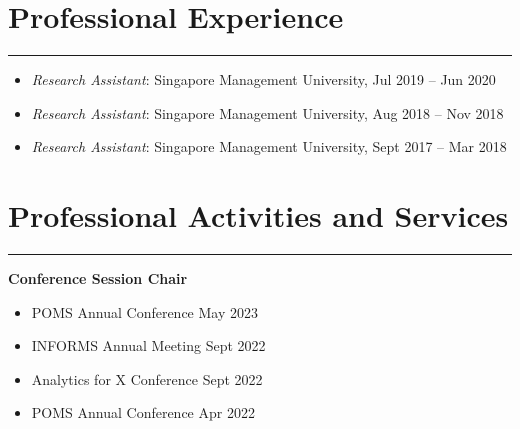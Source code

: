 \documentclass[12pt, a4paper]{article}
\begin{document}
{\begin{itemize}[leftmargin=26pt, itemsep=8pt, parsep=0.2pt, topsep=1pt]
\end{itemize}




\section*{Professional Experience}
\vspace*{0.4em}
\hrule height 0.5pt



\begin{itemize}[leftmargin=26pt, itemsep=0pt, parsep=0.2pt, topsep=1pt]
	\item {\it Research Assistant}: Singapore Management University, Jul 2019 -- Jun 2020
	\item {\it Research Assistant}: Singapore Management University, Aug 2018 -- Nov 2018
  \item {\it Research Assistant}: Singapore Management University, Sept 2017 -- Mar 2018
\end{itemize}




\section*{Professional Activities and Services}
\vspace*{0.4em}
\hrule height 0.5pt



\raggedright\textbf{Conference Session Chair}

\begin{itemize}[leftmargin=26pt, itemsep=2pt, parsep=0pt, topsep=-0.5em]
	\item POMS Annual Conference \hfill May 2023
	\item INFORMS Annual Meeting \hfill Sept 2022
	\item Analytics for X Conference \hfill Sept 2022
	\item POMS Annual Conference \hfill Apr 2022
\end{itemize}



}
\end{document}
